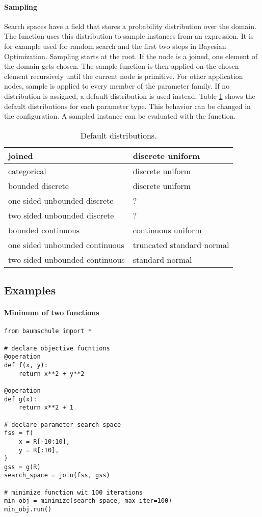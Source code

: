 \documentclass[english]{article}
\begin{document}
\paragraph{Sampling} Search spaces have a  field that stores a probability distribution over the domain. The  function uses this distribution to sample instances from an expression. It is for example used for random search and the first two steps in Bayesian Optimization. Sampling starts at the root. If the node is a joined, one element of the domain gets chosen. The sample function is then applied on the chosen element recursively until the current node is primitive. For other application nodes, sample is applied to every member of the parameter family. If no distribution is assigned, a default distribution is used instead. Table \ref{default dists} shows the default distributions for each parameter type. This behavior can be changed in the configuration. A sampled instance can be evaluated with the  function.

\begin{table}
\centering
\begin{tabular}{|l|l|}
\hline joined & discrete uniform \\
\hline categorical & discrete uniform \\
\hline bounded discrete & discrete uniform \\
\hline one sided unbounded discrete & ? \\
\hline two sided unbounded discrete & ? \\
\hline bounded continuous & continuous uniform \\
\hline one sided unbounded continuous & truncated standard normal \\
\hline two sided unbounded continuous & standard normal \\
\hline
\end{tabular}
\caption{Default distributions.}
\label{default dists}
\end{table}


\subsection{Examples}

\paragraph{Minimum of two functions}
\begin{verbatim}
from baumschule import *

# declare objective fucntions
@operation
def f(x, y):
    return x**2 + y**2

@operation
def g(x):
    return x**2 + 1

# declare parameter search space
fss = f(
    x = R[-10:10],
    y = R[:10],
)
gss = g(R)
search_space = join(fss, gss)

# minimize function wit 100 iterations
min_obj = minimize(search_space, max_iter=100)
min_obj.run()

\end{verbatim}
\end{document}
